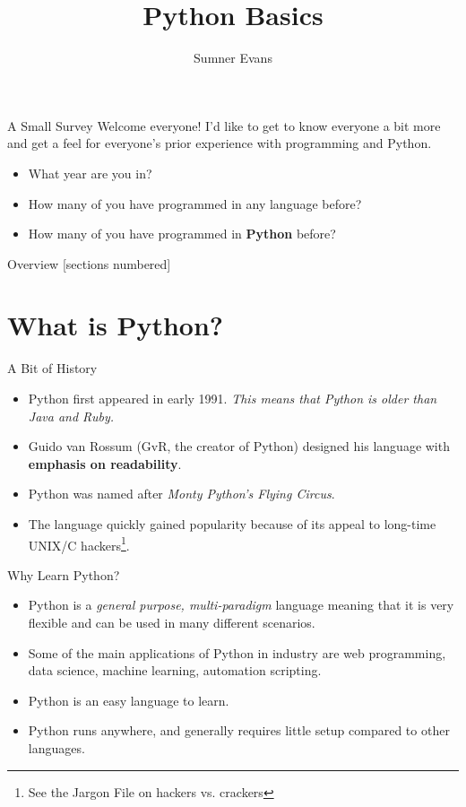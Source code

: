 \documentclass{acm}
\title{Python Basics}
\author{Sumner Evans}
\institute{Mines ACM}
\begin{document}
\begin{frame}{A Small Survey}
    Welcome everyone! I'd like to get to know everyone a bit more and get a feel
    for everyone's prior experience with programming and Python.

    \begin{itemize}[<+->]
        \item What year are you in?
        \item How many of you have programmed in any language before?
        \item How many of you have programmed in \textbf{Python} before?
    \end{itemize}
\end{frame}

\begin{frame}{Overview}
    [sections numbered]
    \tableofcontents[hideallsubsections]
\end{frame}

\section{What is Python?}

\begin{frame}{A Bit of History}
    \begin{itemize}[<+->]
        \item Python first appeared in early 1991. \emph{This means that Python
            is older than Java and Ruby.}
        \item Guido van Rossum (GvR, the creator of Python) designed his
            language with \textbf{emphasis on readability}.
        \item Python was named after \emph{Monty Python's Flying Circus}.
        \item The language quickly gained popularity because of its appeal to
            long-time UNIX/C hackers\footnote{See the Jargon File on hackers
            vs.  crackers}.
    \end{itemize}
\end{frame}

\begin{frame}{Why Learn Python?}
    \begin{itemize}[<+->]
        \item Python is a \textit{general purpose, multi-paradigm} language
            meaning that it is very flexible and can be used in many different
            scenarios.
        \item Some of the main applications of Python in industry are web
            programming, data science, machine learning, automation scripting.
        \item Python is an easy language to learn.
        \item Python runs anywhere, and generally requires little setup compared
            to other languages.
    \end{itemize}
\end{frame}
\end{document}
